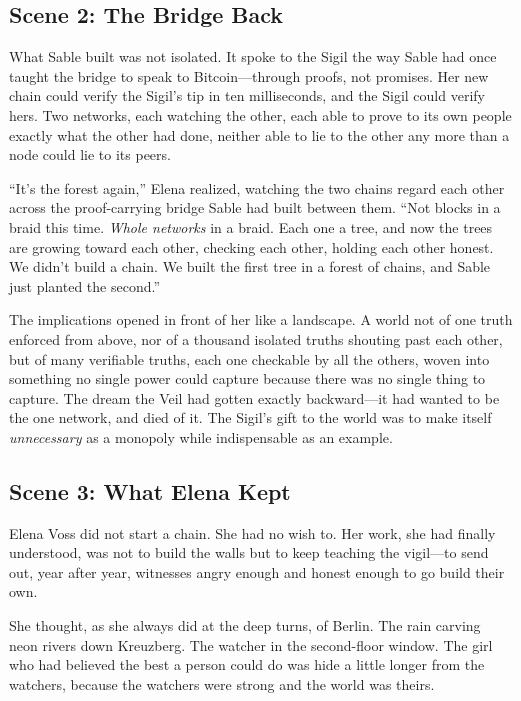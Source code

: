 \hypertarget{scene-2-the-bridge-back}{%
\subsection{Scene 2: The Bridge
Back}\label{scene-2-the-bridge-back}}

What Sable built was not isolated. It spoke to the Sigil the way Sable had once
taught the bridge to speak to Bitcoin---through proofs, not promises. Her new chain
could verify the Sigil's tip in ten milliseconds, and the Sigil could verify hers.
Two networks, each watching the other, each able to prove to its own people exactly
what the other had done, neither able to lie to the other any more than a node could
lie to its peers.

``It's the forest again,'' Elena realized, watching the two chains regard each other
across the proof-carrying bridge Sable had built between them. ``Not blocks in a
braid this time. \emph{Whole networks} in a braid. Each one a tree, and now the trees
are growing toward each other, checking each other, holding each other honest. We
didn't build a chain. We built the first tree in a forest of chains, and Sable just
planted the second.''

The implications opened in front of her like a landscape. A world not of one truth
enforced from above, nor of a thousand isolated truths shouting past each other, but
of many verifiable truths, each one checkable by all the others, woven into something
no single power could capture because there was no single thing to capture. The
dream the Veil had gotten exactly backward---it had wanted to be the one network, and
died of it. The Sigil's gift to the world was to make itself \emph{unnecessary} as a
monopoly while indispensable as an example.

\hypertarget{scene-3-what-elena-kept}{%
\subsection{Scene 3: What Elena
Kept}\label{scene-3-what-elena-kept}}

Elena Voss did not start a chain. She had no wish to. Her work, she had finally
understood, was not to build the walls but to keep teaching the vigil---to send out,
year after year, witnesses angry enough and honest enough to go build their own.

She thought, as she always did at the deep turns, of Berlin. The rain carving neon
rivers down Kreuzberg. The watcher in the second-floor window. The girl who had
believed the best a person could do was hide a little longer from the watchers,
because the watchers were strong and the world was theirs.

